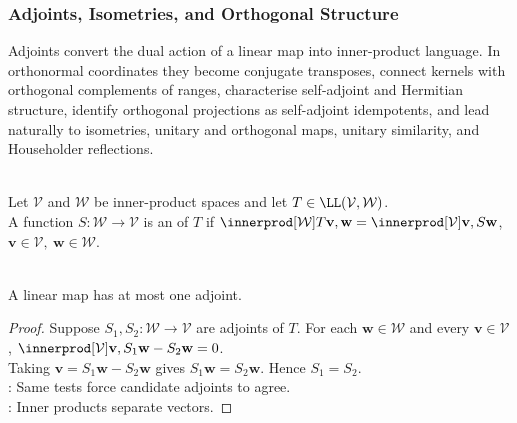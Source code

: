 \subsubsection{Adjoints, Isometries, and Orthogonal Structure}

Adjoints convert the dual action of a linear map into inner-product language. In orthonormal coordinates they become conjugate transposes, connect kernels with orthogonal complements of ranges, characterise self-adjoint and Hermitian structure, identify orthogonal projections as self-adjoint idempotents, and lead naturally to isometries, unitary and orthogonal maps, unitary similarity, and Householder reflections.

\begin{definition} \label{def:adjoint-linear-map} \\
Let $\mathcal{V}$ and $\mathcal{W}$ be inner-product spaces and let $T\in\LL(\mathcal{V},\mathcal{W})$.\\
A function $S:\mathcal{W}\to\mathcal{V}$ is an  of $T$ if $\innerprod[\mathcal{W}]{T\mathbf{v},\mathbf{w}} =\innerprod[\mathcal{V}]{\mathbf{v},S\mathbf{w}}$, $\mathbf{v}\in\mathcal{V},\ \mathbf{w}\in\mathcal{W}$.
\end{definition}

\begin{lemma} \label{lem:adjoint-unique-if-exists} \\
A linear map has at most one adjoint.
\begin{proof}
Suppose $S_1,S_2:\mathcal{W}\to\mathcal{V}$ are adjoints of $T$. For each $\mathbf{w}\in\mathcal{W}$ and every $\mathbf{v}\in\mathcal{V}$, $\innerprod[\mathcal{V}]{\mathbf{v},S_1\mathbf{w}-S_2\mathbf{w}}=0$.\\
Taking $\mathbf{v}=S_1\mathbf{w}-S_2\mathbf{w}$ gives $S_1\mathbf{w}=S_2\mathbf{w}$. Hence $S_1=S_2$.\\
: Same tests force candidate adjoints to agree.\\
: Inner products separate vectors.
\end{proof}
\end{lemma}

